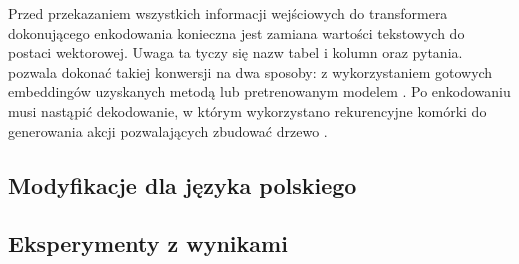 Przed przekazaniem wszystkich informacji wejściowych do transformera dokonującego enkodowania konieczna jest zamiana wartości tekstowych do postaci wektorowej. Uwaga ta tyczy się nazw tabel i kolumn oraz pytania.  pozwala dokonać takiej konwersji na dwa sposoby: z wykorzystaniem gotowych embeddingów uzyskanych metodą  lub pretrenowanym modelem . Po enkodowaniu musi nastąpić dekodowanie, w którym wykorzystano rekurencyjne komórki  do generowania akcji pozwalających zbudować drzewo .



\subsection{Modyfikacje dla języka polskiego}

\subsection{Eksperymenty z wynikami}
